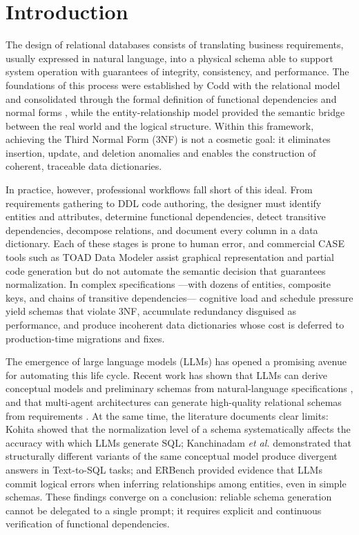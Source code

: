 \documentclass[conference]{IEEEtran}
\begin{document}
\section{Introduction}
The design of relational databases consists of translating business requirements, usually expressed in natural language, into a physical schema able to support system operation with guarantees of integrity, consistency, and performance. The foundations of this process were established by Codd with the relational model \cite{codd1970} and consolidated through the formal definition of functional dependencies and normal forms \cite{codd1971}, while the entity-relationship model \cite{chen1976} provided the semantic bridge between the real world and the logical structure. Within this framework, achieving the Third Normal Form (3NF) is not a cosmetic goal: it eliminates insertion, update, and deletion anomalies and enables the construction of coherent, traceable data dictionaries.

In practice, however, professional workflows fall short of this ideal. From requirements gathering to DDL code authoring, the designer must identify entities and attributes, determine functional dependencies, detect transitive dependencies, decompose relations, and document every column in a data dictionary. Each of these stages is prone to human error, and commercial CASE tools such as TOAD Data Modeler assist graphical representation and partial code generation but do not automate the semantic decision that guarantees normalization. In complex specifications ---with dozens of entities, composite keys, and chains of transitive dependencies--- cognitive load and schedule pressure yield schemas that violate 3NF, accumulate redundancy disguised as performance, and produce incoherent data dictionaries whose cost is deferred to production-time migrations and fixes.

The emergence of large language models (LLMs) has opened a promising avenue for automating this life cycle. Recent work has shown that LLMs can derive conceptual models and preliminary schemas from natural-language specifications \cite{dicaro2026}, and that multi-agent architectures can generate high-quality relational schemas from requirements \cite{wang2025schemaagent}. At the same time, the literature documents clear limits: Kohita \cite{kohita2025} showed that the normalization level of a schema systematically affects the accuracy with which LLMs generate SQL; Kanchinadam \textit{et al.} \cite{kanchinadam2026} demonstrated that structurally different variants of the same conceptual model produce divergent answers in Text-to-SQL tasks; and ERBench \cite{oh2024erbench} provided evidence that LLMs commit logical errors when inferring relationships among entities, even in simple schemas. These findings converge on a conclusion: reliable schema generation cannot be delegated to a single prompt; it requires explicit and continuous verification of functional dependencies.
\end{document}
